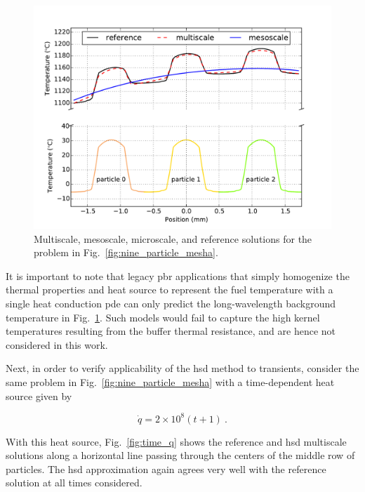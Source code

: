 \begin{figure}[!h]
\centering
\includegraphics[width=0.6\linewidth]{figs/nine_center_row_multiscale.png}
\caption{Multiscale, mesoscale, microscale, and reference solutions for the problem in Fig.\ \ref{fig:nine_particle_mesha}.}
\label{fig:MMD_example}
\end{figure}

It is important to note that legacy \gls{pbr} applications that simply homogenize the thermal properties and heat source to represent the fuel temperature with a single heat conduction \gls{pde} can only predict the long-wavelength background temperature in Fig.\ \ref{fig:MMD_example}. Such models would fail to capture the high kernel temperatures resulting from the buffer thermal resistance, and are hence not considered in this work.

Next, in order to verify applicability of the \gls{hsd} method to transients, consider the same problem in Fig.\ \ref{fig:nine_particle_mesha} with a time-dependent heat source given by

\begin{equation}
\label{eq:time_q}
\dot{q}=2\times10^8(t+1)\ .
\end{equation}

\noindent With this heat source, Fig.\ \ref{fig:time_q} shows the reference and \gls{hsd} multiscale solutions along a horizontal line passing through the centers of the middle row of particles. The \gls{hsd} approximation again agrees very well with the reference solution at all times considered. 

